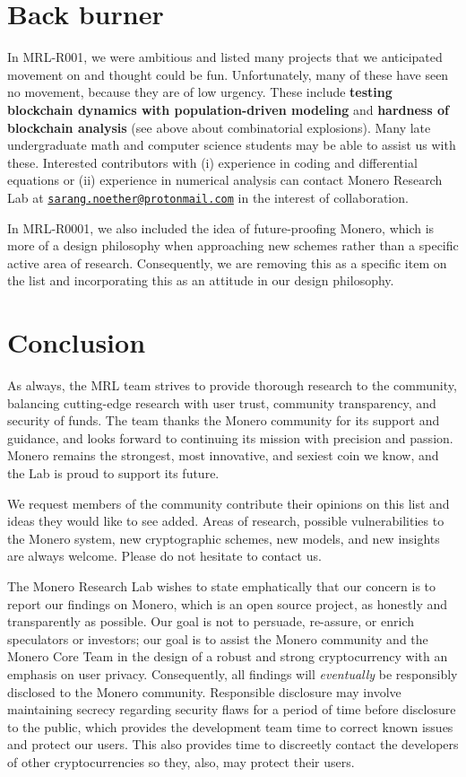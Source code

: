 \documentclass[12pt,english]{mrl}
\theoremstyle{definition}
\numberwithin{equation}{section}
\numberwithin{figure}{section}
\numberwithin{equation}{section}
\numberwithin{equation}{section}
\numberwithin{figure}{section}
\begin{document}
\section{Back burner}

In MRL-R001, we were ambitious and listed many projects that we anticipated movement on and thought could be fun. Unfortunately, many of these have seen no movement, because they are of low urgency. These include \textbf{testing blockchain dynamics with population-driven modeling} and \textbf{hardness of blockchain analysis} (see above about combinatorial explosions). Many late undergraduate math and computer science students may be able to assist us with these. Interested contributors with (i) experience in coding and differential equations or (ii) experience in numerical analysis can contact Monero Research Lab at \href{mailto:sarang.noether@protonmail.com}{\texttt{sarang.noether@protonmail.com}} in the interest of collaboration.

In MRL-R0001, we also included the idea of future-proofing Monero, which is more of a design philosophy when approaching new schemes rather than a specific active area of research. Consequently, we are removing this as a specific item on the list and incorporating this as an attitude in our design philosophy.



\section*{Conclusion}

As always, the MRL team strives to provide thorough research to the community, balancing cutting-edge research with user trust, community transparency, and security of funds. The team thanks the Monero community for its support and guidance, and looks forward to continuing its mission with precision and passion. Monero remains the strongest, most innovative, and sexiest coin we know, and the Lab is proud to support its future.

We request members of the community contribute their opinions on this list and ideas they would like to see added. Areas of research, possible vulnerabilities to the Monero system, new cryptographic schemes, new models, and new insights are always welcome. Please do not hesitate to contact us.  

The Monero Research Lab wishes to state emphatically that our concern is to report our findings on Monero, which is an open source project, as honestly and transparently as possible. Our goal is not to persuade, re-assure, or enrich speculators or investors; our goal is to assist the Monero community and the Monero Core Team in the design of a robust and strong cryptocurrency with an emphasis on user privacy.  Consequently, all findings will \textit{eventually} be responsibly disclosed to the Monero community. Responsible disclosure may involve maintaining secrecy regarding security flaws for a period of time before disclosure to the public, which provides the development team time to correct known issues and protect our users. This also provides time to discreetly contact the developers of other cryptocurrencies so they, also, may protect their users.
\end{document}
